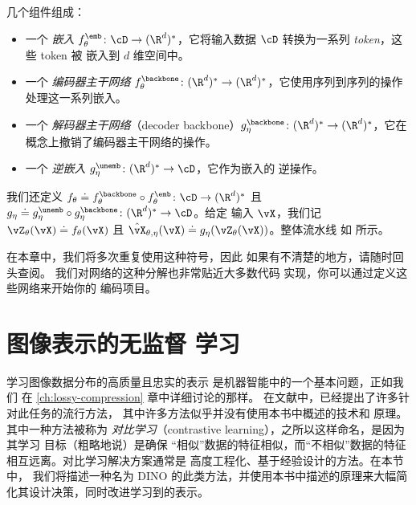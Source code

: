 \documentclass[../../book-main_zh.tex]{subfiles}
\begin{document}
\begin{itemize}
        几个组件组成：
        \begin{itemize}
            \item 一个 \textit{嵌入} \(f_{\theta}^{\emb} \colon
                \cD \to (\R^{d})^{*}\)，它将输入数据
                \(\cD\) 转换为一系列 \textit{token}，这些 token 被
                嵌入到 \(d\) 维空间中。
            \item 一个 \textit{编码器主干网络}
                \(f_{\theta}^{\backbone} \colon (\R^{d})^{*} \to
                (\R^{d})^{*}\)，它使用序列到序列的操作
                处理这一系列嵌入。
            \item 一个 \textit{解码器主干网络}（decoder backbone）\(g_{\eta}^{\backbone}
                \colon (\R^{d})^{*} \to (\R^{d})^{*}\)，它在
                概念上撤销了编码器主干网络的操作。
            \item 一个 \textit{逆嵌入} \(g_{\eta}^{\unemb} \colon
                (\R^{d})^{*} \to \cD\)，它作为嵌入的
                逆操作。
        \end{itemize}
        我们还定义 \(f_{\theta} \doteq f_{\theta}^{\backbone}
        \circ f_{\theta}^{\emb} \colon \cD \to (\R^{d})^{*}\) 且
        \(g_{\eta} \doteq g_{\eta}^{\unemb} \circ
        g_{\eta}^{\backbone} \colon (\R^{d})^{*} \to \cD\)。给定
        输入 \(\vX\)，我们记 \(\vZ_{\theta}(\vX) \doteq
        f_{\theta}(\vX)\) 且 \(\hat{\vX}_{\theta, \eta}(\vX) \doteq
        g_{\eta}(\vZ_{\theta}(\vX))\)。整体流水线
        如  所示。
\end{itemize}

在本章中，我们将多次重复使用这种符号，因此
如果有不清楚的地方，请随时回头查阅。
我们对网络的这种分解也非常贴近大多数代码
实现，你可以通过定义这些网络来开始你的
编码项目。

\section{图像表示的无监督
学习}\label{sec:contrastive_learning}

学习图像数据分布的高质量且忠实的表示
是机器智能中的一个基本问题，正如我们
在 \ref{ch:lossy-compression} 章中详细讨论的那样。
在文献中，已经提出了许多针对此任务的流行方法，
其中许多方法似乎并没有使用本书中概述的技术和
原理。其中一种方法被称为
\textit{对比学习}（contrastive learning），之所以这样命名，是因为其学习
目标（粗略地说）是确保
“相似”数据的特征相似，而“不相似”数据的特征
相互远离。对比学习解决方案通常是
高度工程化、基于经验设计的方法。在本节中，
我们将描述一种名为 DINO \citep{caron2021emerging} 的此类方法，并使用本书中描述的原理来大幅简化其设计决策，同时改进学习到的表示。
\end{document}
